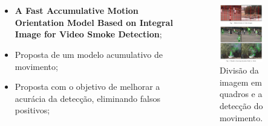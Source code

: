 \documentclass{beamer}
\begin{document}

\section{}

\begin{frame}{}
\begin{columns}
    \begin{column}{0.50\textwidth}
		\begin{itemize}
			\item \textbf{A Fast Accumulative Motion Orientation Model Based on Integral Image for Video 
			Smoke Detection};
			\item Proposta de um modelo acumulativo de movimento;
			\item Proposta com o objetivo de melhorar a acurácia da detecção, eliminando 
			falsos positivos;
		\end{itemize}
    \end{column}

    \begin{column}{0.5\textwidth}
		\begin{figure}[H]
		    \centering
		    \begin{center}
		    \includegraphics[width=0.7\textwidth]{img/fig2-artigo2.png}
		  \caption{Divisão da imagem em quadros e a detecção do movimento.}
		    \label{fig:sar}
		  \end{center}
		\end{figure}
    \end{column}
\end{columns}
\end{frame}
\end{document}

